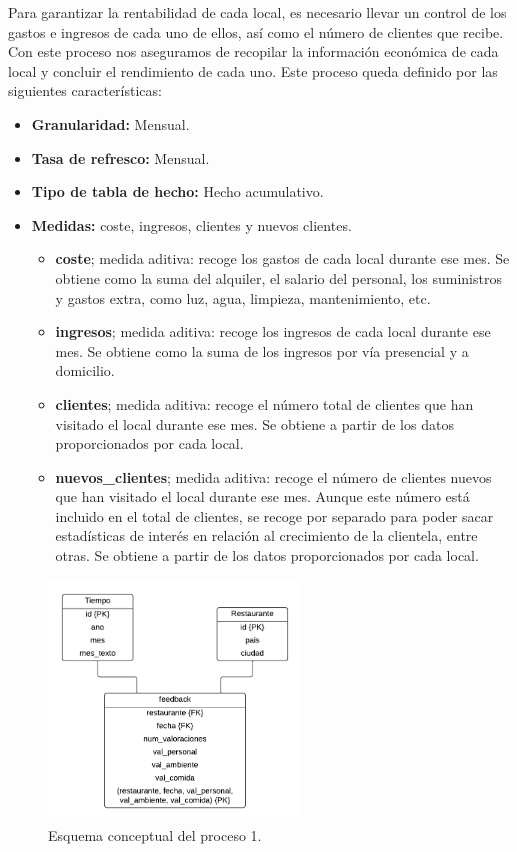 \documentclass[12pt]{opticajnl}
\begin{document}
Para garantizar la rentabilidad de cada local, es necesario llevar un control de los gastos e ingresos de cada uno de ellos, así como el número de clientes que recibe. Con este proceso nos aseguramos de recopilar la información económica de cada local y concluir el rendimiento de cada uno. Este proceso queda definido por las siguientes características:
\begin{itemize}
\item \textbf{Granularidad:} Mensual.
\item \textbf{Tasa de refresco:} Mensual.
\item \textbf{Tipo de tabla de hecho:} Hecho acumulativo.
\item \textbf{Medidas:} coste, ingresos, clientes y nuevos clientes.
\begin{itemize}
\item \textbf{coste}; medida aditiva: recoge los gastos de cada local durante ese mes. Se obtiene como la suma del alquiler, el salario del personal, los suministros y gastos extra, como luz, agua, limpieza, mantenimiento, etc. 
\item \textbf{ingresos}; medida aditiva: recoge los ingresos de cada local durante ese mes. Se obtiene como la suma de los ingresos por vía presencial y a domicilio.
\item \textbf{clientes}; medida aditiva: recoge el número total de clientes que han visitado el local durante ese mes. Se obtiene a partir de los datos proporcionados por cada local.
\item \textbf{nuevos\_clientes}; medida aditiva: recoge el número de clientes nuevos que han visitado el local durante ese mes. Aunque este número está incluido en el total de clientes, se recoge por separado para poder sacar estadísticas de interés en relación al crecimiento de la clientela, entre otras. Se obtiene a partir de los datos proporcionados por cada local.
\end{itemize}
\end{itemize}

\begin{figure}[h]
\centering
\includegraphics[width=0.6\textwidth]{fotos/fin.pdf}
\caption{Esquema conceptual del proceso 1.}
\label{fig:esquema_proceso1}
\end{figure}
\end{document}
